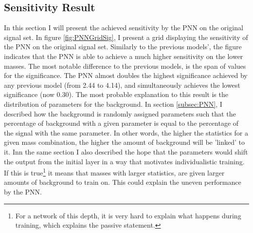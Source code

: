 \subsection{Sensitivity Result}
In this section I will present the achieved sensitivity by the \ac{PNN} on the original signal set. In figure \ref{fig:PNNGridSig}, I present a grid displaying the sensitivity 
of the \ac{PNN} on the original signal set. Similarly to the previous models', the figure indicates that the \ac{PNN} is able to achieve a much higher sensitivity on the lower
masses. The most notable difference to the previous models, is the span of values for the significance. The \ac{PNN} almost doubles the highest significance achieved by any previous model
(from 2.44 to 4.14), and simultaneously achieves the lowest significance (now 0.30). The most probable explanation to this result is the distribution of parameters for the background. 
In section \ref{subsec:PNN}, I described how the background is randomly assigned parameters such that the percentage of background with a given parameter is equal to the percentage 
of the signal with the same parameter. In other words, the higher the statistics for a given mass combination, the higher the amount of background will be 'linked' to it. Inn the 
same section I also described the hope that the parameters would shift the output from the initial layer in a way that motivates individualistic training. If this is 
true\footnote{For a network of this depth, it is very hard to explain what happens during training, which explains the passive statement.} it means that masses with larger statistics, 
are given larger amounts of background to train on. This could explain the uneven performance by the \ac{PNN}. \\
